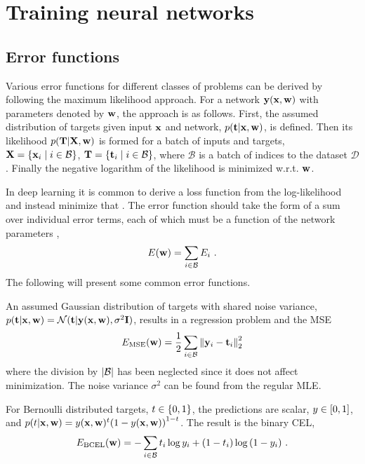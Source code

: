 
\section{Training neural networks}
\subsection{Error functions}
Various error functions for different classes of problems can be derived by following the maximum likelihood approach. For a network ${\mathbf{y}}({\mathbf{x}},{\mathbf{w}})$ with parameters denoted by ${\mathbf{w}}$, the approach is as follows. First, the assumed distribution of targets given input ${\mathbf{x}}$ and network, $p({\mathbf{t}}|{\mathbf{x}},{\mathbf{w}})$, is defined. Then its likelihood $p({\mathbf{T}}|{\mathbf{X}},{\mathbf{w}})$ is formed for a batch of inputs and targets, ${\mathbf{X}}={\left\{{\mathbf{x}}_i \mid i\in\mathcal{B}\right\}}$, ${\mathbf{T}}={\left\{{\mathbf{t}}_i \mid i\in\mathcal{B}\right\}}$, where $\mathcal{B}$ is a batch of indices to the dataset $\mathcal{D}$. Finally the negative logarithm of the likelihood is minimized w.r.t. ${\mathbf{w}}$.

In deep learning it is common to derive a loss function from the log-likelihood and instead minimize that \cite{Bishop2006}. The error function should take the form of a sum over individual error terms, each of which must be a function of the network parameters \cite{Nielsen2015},
\begin{equation}\label{eq: Neural networks: Error as a sum over individual terms}
    E({\mathbf{w}}) = \sum_{i\in\mathcal{B}} E_i \ .
\end{equation}
The following will present some common error functions.

An assumed Gaussian distribution of targets with shared noise variance, $p({\mathbf{t}}|{\mathbf{x}},{\mathbf{w}})=\mathcal{N}({\mathbf{t}}|{\mathbf{y}}({\mathbf{x}},{\mathbf{w}}),\sigma^2{\mathbf{I}})$, results in a regression problem and the \gls{MSE}
\begin{equation}
    E_\text{MSE}({\mathbf{w}}) = \frac{1}{2}\sum_{i\in\mathcal{B}} {\left\lVert{\mathbf{y}}_i-{\mathbf{t}}_i\right\rVert}^2_2
\end{equation}
where the division by ${\left\lvert\mathcal{B}\right\rvert}$ has been neglected since it does not affect minimization. The noise variance $\sigma^2$ can be found from the regular \gls{MLE}.

For Bernoulli distributed targets, $t\in{\left\{0,1\right\}}$, the predictions are scalar, $y\in{\left[0,1\right]}$, and $p(t|{\mathbf{x}},{\mathbf{w}})=y({\mathbf{x}},{\mathbf{w}})^t{\left(1-y({\mathbf{x}},{\mathbf{w}})\right)}^{1-t}$. The result is the binary \gls{CEL},
\begin{equation}
    E_\text{BCEL}({\mathbf{w}}) = -\sum_{i\in\mathcal{B}} t_i\log y_i + {\left(1-t_i\right)}\log{\left(1-y_i\right)} \ .
\end{equation}

